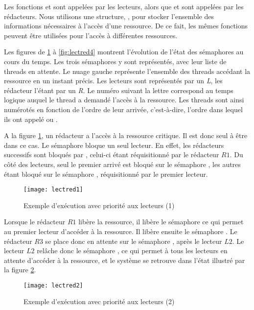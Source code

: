Les fonctions  et  sont appelées par les lecteurs, alors que  et  sont appelées par les rédacteurs. Nous utilisons une structure, , pour stocker l'ensemble des informations nécessaires à l'accès d'une ressource. De ce fait, les mêmes fonctions peuvent être utilisées pour l'accès à différentes ressources.

Les figures de \ref{fig:lectred1} à \ref{fig:lectred4} montrent l'évolution de l'état des sémaphores au cours du temps. Les trois sémaphores y sont représentés, avec leur liste de threads en attente. Le nuage gauche représente l'ensemble des threads accédant la ressource en un instant précis. Les lecteurs sont représentés par un \emph{L}, les rédacteur l'étant par un \emph{R}. Le numéro suivant la lettre correspond au temps logique auquel le thread a demandé l'accès à la ressource. Les threads sont ainsi numérotés en fonction de l'ordre de leur arrivée, c'est-à-dire, l'ordre dans lequel ils ont appelé  ou .

A la figure \ref{fig:lectred1}, un rédacteur a l'accès à la ressource critique. Il est donc seul à être dans ce cas. Le sémaphore  bloque un seul lecteur. En effet, les rédacteurs successifs sont bloqués par , celui-ci étant réquisitionné par le rédacteur $R1$. Du côté des lecteurs, seul le premier arrivé est bloqué sur le sémaphore , les autres étant bloqué sur le sémaphore , réquisitionné par le premier lecteur.

\begin{figure}[!ht]
  \centering
    \texttt{[image: lectred1]}
    \caption{\label{fig:lectred1}Exemple d'exécution avec priorité aux lecteurs (1)}

\end{figure}

Lorsque le rédacteur $R1$ libère la ressource, il libère le sémaphore  ce qui permet au premier lecteur d'accéder à la ressource.
Il libère ensuite le sémaphore . Le rédacteur $R3$ se place donc en attente sur le sémaphore , après le lecteur $L2$.
Le lecteur $L2$ relâche donc le sémaphore , ce qui permet à tous les lecteurs en attente d'accéder à la ressource, et le système se retrouve dans l'état illustré par la figure \ref{fig:lectred2}.

\begin{figure}[!ht]
  \centering
    \texttt{[image: lectred2]}
    \caption{\label{fig:lectred2}Exemple d'exécution avec priorité aux lecteurs (2)}

\end{figure}

